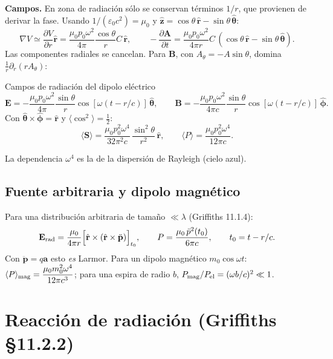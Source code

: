 \documentclass[11pt,a4paper]{article}
\newcommand{\av}{\mathbf a}
\theoremstyle{remark}
\begin{document}
\textbf{Campos.} En zona de radiación sólo se conservan términos $1/r$, que provienen de derivar la
fase. Usando $1/(\varepsilon_0c^2)=\mu_0$ y $\hat{\mathbf z}=\cos\theta\,\hat{\mathbf r}-\sin\theta\,\hat{\bm\theta}$:
\[
\nabla V\simeq\frac{\partial V}{\partial r}\hat{\mathbf r}=\frac{\mu_0p_0\omega^2}{4\pi}\frac{\cos\theta}{r}C\,\hat{\mathbf r},
\qquad
-\frac{\partial\mathbf A}{\partial t}=\frac{\mu_0p_0\omega^2}{4\pi r}C\,(\cos\theta\,\hat{\mathbf r}-\sin\theta\,\hat{\bm\theta}).
\]
Las componentes radiales se cancelan. Para $\mathbf B$, con $A_\theta=-A\sin\theta$, domina
$\frac1r\partial_r(rA_\theta)$:
\begin{resbox}{Campos de radiación del dipolo eléctrico}
\begin{equation}
\mathbf E=-\frac{\mu_0p_0\omega^2}{4\pi}\frac{\sin\theta}{r}\cos[\omega(t-r/c)]\,\hat{\bm\theta},\qquad
\mathbf B=-\frac{\mu_0p_0\omega^2}{4\pi c}\frac{\sin\theta}{r}\cos[\omega(t-r/c)]\,\hat{\bm\phi}.
\end{equation}
Con $\hat{\bm\theta}\times\hat{\bm\phi}=\hat{\mathbf r}$ y $\langle\cos^2\rangle=\tfrac12$:
\begin{equation}
\langle\mathbf S\rangle=\frac{\mu_0p_0^2\omega^4}{32\pi^2c}\,\frac{\sin^2\theta}{r^2}\,\hat{\mathbf r},\qquad
\langle P\rangle=\frac{\mu_0p_0^2\omega^4}{12\pi c}.
\end{equation}
\end{resbox}
La dependencia $\omega^4$ es la de la dispersión de Rayleigh (cielo azul).

\subsection{Fuente arbitraria y dipolo magnético}

Para una distribución arbitraria de tamaño $\ll\lambda$ (Griffiths 11.1.4):
\begin{equation}
\mathbf E_{\rm rad}=\frac{\mu_0}{4\pi r}\Big[\hat{\mathbf r}\times(\hat{\mathbf r}\times\ddot{\mathbf p})\Big]_{t_0},\qquad
P=\frac{\mu_0\,\ddot p^2(t_0)}{6\pi c},\qquad t_0=t-r/c.
\end{equation}
Con $\ddot{\mathbf p}=q\av$ esto \emph{es} Larmor. Para un dipolo magnético $m_0\cos\omega t$:
$\langle P\rangle_{\rm mag}=\dfrac{\mu_0m_0^2\omega^4}{12\pi c^3}$; para una espira de radio $b$,
$P_{\rm mag}/P_{\rm el}=(\omega b/c)^2\ll1$.

\section{Reacción de radiación (Griffiths §11.2.2)}
\end{document}
